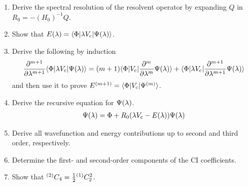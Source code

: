 \documentclass[11pt]{article}
\begin{document}
\begin{enumerate}
\item
Derive the spectral resolution of the resolvent operator by expanding $Q$ in
$
  R_0
=
-
  (H_0)^{-1}
  Q
$.


\item\label{item:energy-equation}
Show that
$
  E(\lambda )
=
  \langle\Phi |\lambda  V_{\mathrm{c}}|\Psi (\lambda )\rangle
$.

\item
Derive the following by induction
\begin{align}
  \frac {\partial^{m+1}}{\partial\lambda ^{m+1}}
  \langle\Phi |\lambda  V_{\mathrm{c}}|\Psi (\lambda )\rangle
=
  (m+1)
  \langle\Phi |V_{\mathrm{c}}|\frac {\partial^m}{\partial\lambda ^m}\Psi (\lambda )\rangle
+
  \langle\Phi |\lambda  V_{\mathrm{c}}|\frac {\partial^{m+1}}{\partial\lambda ^{m+1}}\Psi (\lambda )\rangle
\end{align}
and then use it to prove 
$
  E^{(m+1)}
=
  \langle\Phi |V_{\mathrm{c}}|\Psi ^{(m)}\rangle
$.


\item\label{item:recursive-wavefunction-equation}
Derive the recursive equation for $\Psi (\lambda )$.
\begin{align}
\label{eq:recursive-wavefunction-equation}
  \Psi (\lambda )
=
  \Phi 
+
  R_0
  (
    \lambda 
    V_{\mathrm{c}}
  -
    E(\lambda )
  )
  \Psi (\lambda )
\end{align}


\item
Derive all wavefunction and energy contributions up to second and third order, respectively.


\item
Determine the first- and second-order components of the CI coefficients.

\item
Show that
$
  {}^{(2)}
  C_4
=
  \tfrac{1}{2}
  {}^{(1)}
  C_2^2
$.

\end{enumerate}
\end{document}
